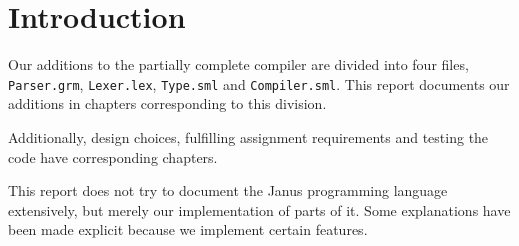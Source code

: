 \section{Introduction}
Our additions to the partially complete compiler are divided into four
files, {\tt Parser.grm}, {\tt Lexer.lex}, {\tt Type.sml} and {\tt Compiler.sml}.
This report documents our additions in chapters corresponding to this division.

Additionally, design choices, fulfilling assignment requirements and testing
the code have corresponding chapters.

This report does not try to document the Janus programming language extensively,
but merely our implementation of parts of it. Some explanations have been made
explicit because we implement certain features.
